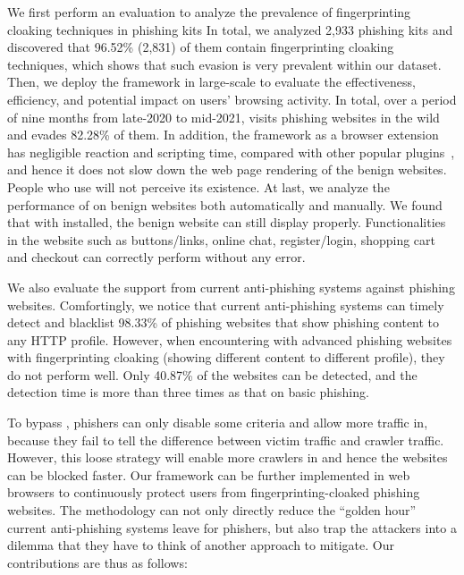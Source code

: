 We first perform an evaluation to analyze the prevalence of fingerprinting cloaking techniques in phishing kits
In total, we analyzed 2,933 phishing kits and discovered that 96.52\% (2,831) of them contain fingerprinting cloaking techniques, which shows that such evasion is very prevalent within our dataset.
Then, we deploy the \spartacus framework in large-scale to evaluate the effectiveness, efficiency, and potential impact on users' browsing activity.
In total, over a period of nine months from late-2020 to mid-2021, \spartacus visits \totalphishing phishing websites in the wild and evades 82.28\% of them.
In addition, the \spartacus framework as a browser extension has negligible reaction and scripting time, compared with other popular plugins~\cite{exthouse}, and hence it does not slow down the web page rendering of the benign websites.
People who use \spartacus will not perceive its existence.
At last, we analyze the performance of \spartacus on benign websites both automatically and manually.
We found that with \spartacus installed, the benign website can still display properly.
Functionalities in the website such as buttons/links, online chat, register/login, shopping cart and checkout can correctly perform without any error.

We also evaluate the support from current anti-phishing systems against phishing websites.
Comfortingly, we notice that current anti-phishing systems can timely detect and blacklist 98.33\% of phishing websites that show phishing content to any HTTP profile.
However, when encountering with advanced phishing websites with fingerprinting cloaking (showing different content to different profile), they do not perform well.
Only 40.87\% of the websites can be detected, and the detection time is more than three times as that on basic phishing.

To bypass \spartacus, phishers can only disable some criteria and allow more traffic in, because they fail to tell the difference between victim traffic and crawler traffic.
However, this loose strategy will enable more crawlers in and hence the websites can be blocked faster.
Our \spartacus framework can be further implemented in web browsers to continuously protect users from fingerprinting-cloaked phishing websites.
The methodology can not only directly reduce the ``golden hour'' current anti-phishing systems leave for phishers,
but also trap the attackers into a dilemma that they have to think of another approach to mitigate.
Our contributions are thus as follows:

